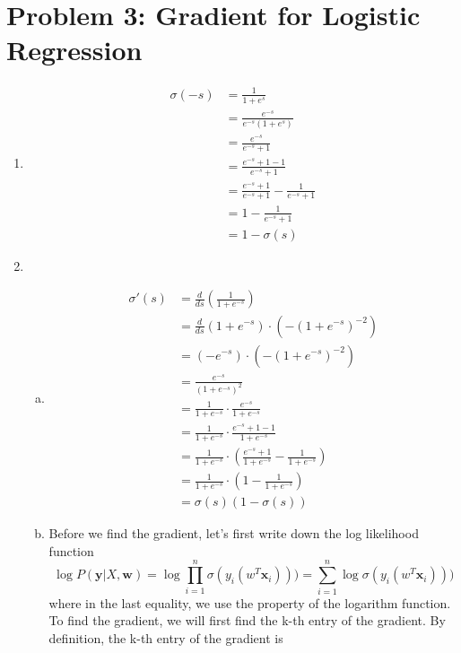\documentclass[11pt]{article}
\begin{document}
\section*{Problem 3: Gradient for Logistic Regression}
	\begin{enumerate}
		\item 
		\begin{align*}
		\sigma(-s) & = \frac{1}{1+e^s}\\
				   & = \frac{e^{-s}}{e^{-s}(1+e^s)}\\
				   & =\frac{e^{-s}}{e^{-s} + 1}\\
				   & =\frac{e^{-s} + 1 - 1}{e^{-s} + 1}\\
				   &=\frac{e^{-s} + 1}{e^{-s} + 1} - \frac{1}{e^{-s} + 1} \\
				   &=1 - \frac{1}{e^{-s} + 1}\\
				   &=1 - \sigma(s)   
		\end{align*}
		
		\item 
		\begin{enumerate}[(a)]
			\item
			\begin{align*}
			\sigma ' (s)  &=\frac{d}{ds} (\frac{1}{1+e^{-s}}) \\
				&=\frac{d}{ds} (1+e^{-s})\cdot (- (1 + e^{-s})^{-2}) \\
				&=(-e^{-s})\cdot (- (1 + e^{-s})^{-2}) \\
				&=\frac{e^{-s}}{(1 + e^{-s})^2} \\
				&=\frac{1}{1 + e^{-s}} \cdot \frac{e^{-s}}{1 + e^{-s}}\\
				&=\frac{1}{1 + e^{-s}} \cdot \frac{e^{-s} + 1 - 1}{1 + e^{-s}}\\
				&=\frac{1}{1 + e^{-s}} \cdot (\frac{e^{-s} + 1}{1 + e^{-s}} - \frac{1}{1+e^{-s}})\\
				&=\frac{1}{1 + e^{-s}} \cdot (1 - \frac{1}{1+e^{-s}})\\
				&= \sigma(s)(1-\sigma (s))
			\end{align*}

    			\item Before we find the gradient, let's first write down the 	log likelihood function
    			$$\log P(\mathbf{y} | X, \mathbf{w}) = \log \prod_{i = 1}^{n} \sigma(y_i(w^T\mathbf{x}_i))) = \sum_{i = 1}^{n} \log \sigma(y_i(w^T\mathbf{x}_i)))$$ 
    			where in the last equality, we use the property of the logarithm function. To find the gradient, we will first find the k-th entry of the gradient. By definition, the k-th entry of the gradient is 
    

\end{enumerate}
\end{enumerate}
\end{document}

